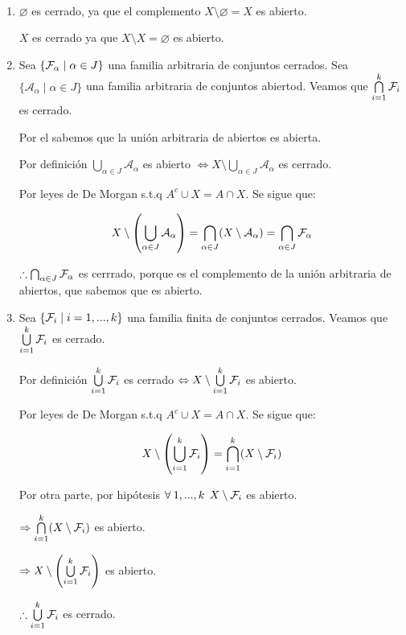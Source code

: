 \begin{orangeproof}
    \
    \begin{enumerate}
    
        \item  $\varnothing$ es cerrado, ya que el complemento $X \setminus \varnothing = X$ es abierto.

        $X$ es cerrado ya que $X \setminus X = \varnothing$ es abierto.

        \item Sea $\{ {\mathcal{F}}_{\alpha} \mid \alpha \in J \}$  una familia arbitraria de conjuntos cerrados. Sea  $\{ {\mathcal{A}}_{\alpha} \mid \alpha \in J \}$  una familia arbitraria de conjuntos abiertod. Veamos que $\bigcap\limits_{i=1}^{k}{\mathcal{F}}_{i}$ es cerrado.

        Por el  sabemos que la unión arbitraria de abiertos es abierta. 

        Por definición $\bigcup\limits_{\alpha \in J}{\mathcal{A}}_{\alpha}$ es abierto $\Leftrightarrow X \setminus \bigcup\limits_{\alpha \in J}{\mathcal{A}}_{\alpha}$ es cerrado.

        
        Por leyes de De Morgan s.t.q ${A}^{c} \cup X = A \cap X$. Se sigue que:

        \begin{equation*}
             X \setminus \left( \bigcup_{\alpha \in J}{\mathcal{A}}_{\alpha} \right) = \bigcap_{\alpha \in J} (X \setminus {\mathcal{A}}_{\alpha}) = \bigcap_{\alpha \in J} \mathcal{F}_\alpha
        \end{equation*}

        $\therefore \bigcap_{\alpha \in J} \mathcal{F}_\alpha$ es cerrrado, porque es el complemento de la unión arbitraria de abiertos, que sabemos que es abierto. 

        \item Sea $\{ {\mathcal{F}}_{i} \mid i=1,...,k \}$  una familia finita de conjuntos cerrados. Veamos que $\bigcup\limits_{i=1}^{k}{\mathcal{F}}_{i}$ es cerrado. 

        Por definición $\bigcup\limits_{i=1}^{k}{\mathcal{F}}_{i}$ es cerrado $\Leftrightarrow X \setminus \bigcup\limits_{i=1}^{k}{\mathcal{F}}_{i}$ es abierto.

        
        Por leyes de De Morgan s.t.q ${A}^{c} \cup X = A \cap X$. Se sigue que:

        \begin{equation*}
             X \setminus \left( \bigcup_{i=1}^{k}{\mathcal{F}}_{i} \right) = \bigcap_{i=1}^{k} (X \setminus {\ensuremath{\mathcal{F}}}_{i})
        \end{equation*}

        Por otra parte, por hipótesis $\forall \: 1,...,k \: \: X \setminus {\ensuremath{\mathcal{F}}}_{i}$ es abierto.

        $\Rightarrow \bigcap\limits_{i=1}^{k} (X \setminus {\ensuremath{\mathcal{F}}}_{i})$ es abierto.

        $\Rightarrow X \setminus \left( \bigcup\limits_{i=1}^{k}{\mathcal{F}}_{i} \right)$ es abierto.

        $\therefore \bigcup\limits_{i=1}^{k}{\mathcal{F}}_{i}$ es cerrado.
    \end{enumerate}
\end{orangeproof}

